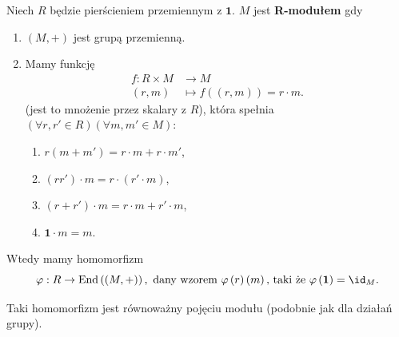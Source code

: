 \begin{definition}[R-moduł.]
	Niech $R$ będzie pierścieniem przemiennym z $\mathbf{1}$. $M$ jest \textbf{R-modułem} gdy
	\begin{enumerate}[label=\arabic*)]
		\item $\left(M, +  \right) $ jest grupą przemienną.
		\item Mamy funkcję \begin{align*}
			f: R\times M &\longrightarrow M \\
			\left( r,m \right)  &\longmapsto f(\left( r,m \right) ) = r\cdot m		
		.\end{align*}
		(jest to mnożenie przez skalary z $R$), która spełnia $\left(\forall r,r' \in R\right)\left(\forall m,m'\in M \right) $:
		\begin{enumerate}[label=\roman*)]
			\item $r\left( m+m' \right) = r\cdot m + r\cdot m'$,
			\item $\left( rr' \right) \cdot m = r\cdot \left( r'\cdot m \right) $,
			\item $\left( r+r' \right) \cdot m = r\cdot m + r'\cdot m$,
			\item $\mathbf{1}\cdot m = m$.
		\end{enumerate}
	\end{enumerate}
\end{definition} 

Wtedy mamy homomorfizm 
\[
\varphi :R \to \text{End}\left( \left( M,+ \right)  \right), \text{ dany wzorem } \varphi \left( r \right) \left( m \right) \text{, taki że } \varphi \left( \mathbf{1} \right) = \id_{M}   
.\] 

Taki homomorfizm jest równoważny pojęciu modułu (podobnie jak dla działań grupy).

